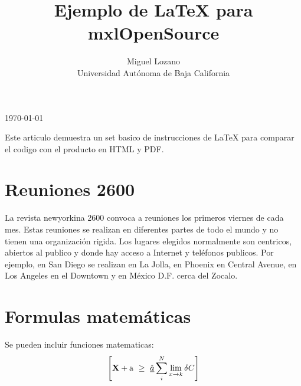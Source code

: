 
\setlength{\topmargin}{-.5in}
\setlength{\textheight}{9in}
\setlength{\oddsidemargin}{.125in}
\setlength{\textwidth}{6.25in}


\title{Ejemplo de LaTeX para mxlOpenSource}
\author{Miguel Lozano\\
Universidad Autónoma de Baja California}

\today
\maketitle
Este articulo demuestra un set basico de instrucciones de LaTeX para comparar
el codigo con el producto en HTML y PDF.

\section {Reuniones 2600}
La revista newyorkina 2600 convoca a reuniones los primeros viernes
de cada mes. Estas reuniones 
    se realizan en diferentes partes de todo
        el mundo y no tienen
         una
          organización rigida. Los lugares elegidos
normalmente son
 centricos, abiertos al publico y donde hay acceso
a Internet y teléfonos publicos. Por ejemplo, en San Diego se realizan
en
     La Jolla, en Phoenix en Central Avenue,
      en Los Angeles en el Downtown
            y en México D.F. cerca del Zocalo.
            
\section {Formulas matemáticas}
Se pueden incluir funciones matematicas:
\begin{equation}
\left[
{\bf X} + {\rm a} \ \geq\ 
\underline{\hat a} \sum_i^N \lim_{x \rightarrow k} \delta C
\right]
\end{equation}


